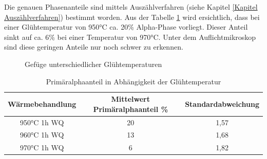 \documentclass[a4paper, 11pt]{tubsreprt}
\begin{document}
Die genauen Phasenanteile sind mittels Auszählverfahren (siehe Kapitel \ref{Kapitel Auszählverfahren}) bestimmt worden. Aus der Tabelle \ref{Tabelle Primäralphaanteil} wird ersichtlich, dass bei einer Glühtemperatur von 950°C ca. 20\% Alpha-Phase vorliegt. Dieser Anteil sinkt auf ca. 6\% bei einer Temperatur von 970°C. Unter dem Auflichtmikroskop sind diese geringen Anteile nur noch schwer zu erkennen.  


\begin{figure}
\caption{Gefüge unterschiedlicher Glühtemperaturen}
\label{Alle Glühen}
\end{figure}

\begin{table}
\begin{tabular}{c | c | c}
Wärmebehandlung & Mittelwert Primäralphaanteil \% & Standardabweichung \\
\hline
950°C 1h WQ	& 20 	&	1,57 \\
960°C 1h WQ	& 13 	&	1,68 \\
970°C 1h WQ	& 6  	&	1,82 \\
\end{tabular}
\caption{Primäralphaanteil in Abhängigkeit der Glühtemperatur}
\label{Tabelle Primäralphaanteil}
\end{table}
\end{document}
